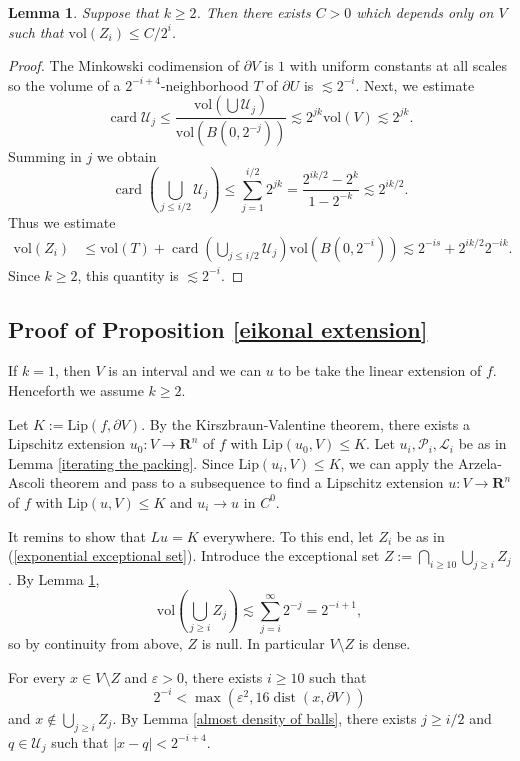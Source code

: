 \documentclass[reqno,11pt]{amsart}
\newcommand{\RR}{\mathbf{R}}
\DeclareMathOperator{\card}{card}
\DeclareMathOperator{\dist}{dist}
\newcommand{\vol}{\mathrm{vol}}
\newcommand{\Lip}{\mathrm{Lip}}
\newtheorem{lemma}[theorem]{Lemma}
\theoremstyle{definition}
\numberwithin{equation}{section}
\begin{document}
\begin{lemma}\label{decay of the exceptional set}
Suppose that $k \geq 2$.
Then there exists $C > 0$ which depends only on $V$ such that $\vol(Z_i) \leq C/2^i$.
\end{lemma}
\begin{proof}
The Minkowski codimension of $\partial V$ is $1$ with uniform constants at all scales so the volume of a $2^{-i+4}$-neighborhood $T$ of $\partial U$ is $\lesssim 2^{-i}$.
Next, we estimate
$$\card \mathscr U_j \leq \frac{\vol(\bigcup \mathscr U_j)}{\vol(B(0, 2^{-j}))} \lesssim 2^{jk} \vol(V) \lesssim 2^{jk}.$$
Summing in $j$ we obtain 
$$\card\left(\bigcup_{j \leq i/2} \mathscr U_j\right) \leq \sum_{j=1}^{i/2} 2^{jk} = \frac{2^{ik/2} - 2^k}{1 - 2^{-k}} \lesssim 2^{ik/2}.$$
Thus we estimate
\begin{align*}
\vol(Z_i)
&\leq \vol(T) + \card\left(\bigcup_{j \leq i/2} \mathscr U_j\right) \vol(B(0, 2^{-i})) 
\lesssim 2^{-is} + 2^{ik/2} 2^{-ik}.
\end{align*}
Since $k \geq 2$, this quantity is $\lesssim 2^{-i}$.
\end{proof}

\subsection{Proof of Proposition \ref{eikonal extension}}
If $k = 1$, then $V$ is an interval and we can $u$ to be take the linear extension of $f$.
Henceforth we assume $k \geq 2$.

Let $K := \Lip(f, \partial V)$.
By the Kirszbraun-Valentine theorem, there exists a Lipschitz extension $u_0: V \to \RR^n$ of $f$ with $\Lip(u_0, V) \leq K$.
Let $u_i, \mathscr P_i, \mathscr L_i$ be as in Lemma \ref{iterating the packing}.
Since $\Lip(u_i, V) \leq K$, we can apply the Arzela-Ascoli theorem and pass to a subsequence to find a Lipschitz extension $u: V \to \RR^n$ of $f$ with $\Lip(u, V) \leq K$ and $u_i \to u$ in $C^0$.

It remins to show that $Lu = K$ everywhere.
To this end, let $Z_i$ be as in (\ref{exponential exceptional set}).
Introduce the exceptional set $Z := \bigcap_{i \geq 10} \bigcup_{j \geq i} Z_j$.
By Lemma \ref{decay of the exceptional set},
$$\vol\left(\bigcup_{j \geq i} Z_j\right) \lesssim \sum_{j = i}^\infty 2^{-j} = 2^{-i + 1},$$
so by continuity from above, $Z$ is null.
In particular $V \setminus Z$ is dense.

For every $x \in V \setminus Z$ and $\varepsilon > 0$, there exists $i \geq 10$ such that
$$2^{-i} < \max(\varepsilon^2, 16 \dist(x, \partial V))$$
and $x \notin \bigcup_{j \geq i} Z_j$.
By Lemma \ref{almost density of balls}, there exists $j \geq i/2$ and $q \in \mathscr U_j$ such that $|x - q| < 2^{-i + 4}$.
\end{document}
